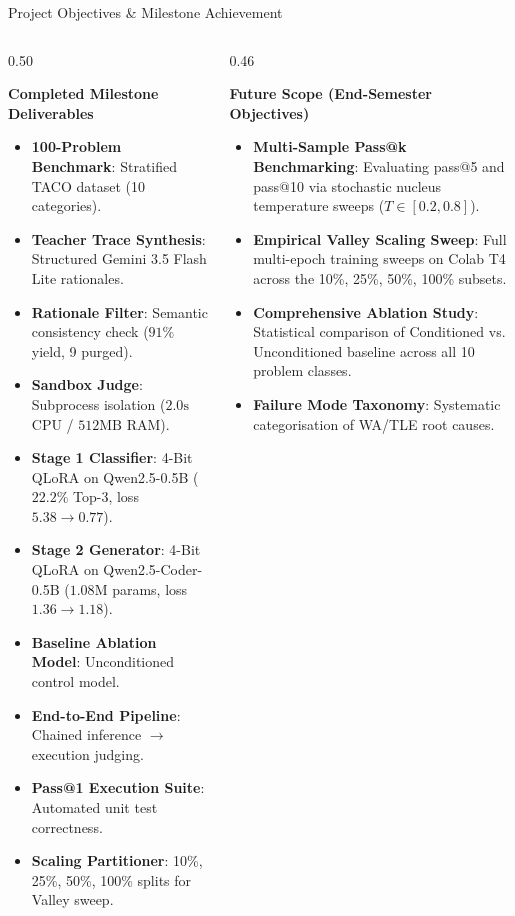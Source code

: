 \documentclass[aspectratio=169,10pt]{beamer}
\begin{document}
\begin{frame}{Project Objectives \& Milestone Achievement}
  \begin{columns}[T]
    \begin{column}{0.50\textwidth}
      \begin{block}{\textbf{Completed Milestone Deliverables}}
        \begin{itemize}\itemsep=1.0pt\scriptsize
          \item \textbf{100-Problem Benchmark}: Stratified TACO dataset (10 categories).
          \item \textbf{Teacher Trace Synthesis}: Structured Gemini 3.5 Flash Lite rationales.
          \item \textbf{Rationale Filter}: Semantic consistency check ($91\%$ yield, 9 purged).
          \item \textbf{Sandbox Judge}: Subprocess isolation ($2.0\text{s}$ CPU / $512\text{MB}$ RAM).
          \item \textbf{Stage 1 Classifier}: 4-Bit QLoRA on Qwen2.5-0.5B ($22.2\%$ Top-3, loss $5.38 \to 0.77$).
          \item \textbf{Stage 2 Generator}: 4-Bit QLoRA on Qwen2.5-Coder-0.5B ($1.08\text{M}$ params, loss $1.36 \to 1.18$).
          \item \textbf{Baseline Ablation Model}: Unconditioned control model.
          \item \textbf{End-to-End Pipeline}: Chained inference $\to$ execution judging.
          \item \textbf{Pass@1 Execution Suite}: Automated unit test correctness.
          \item \textbf{Scaling Partitioner}: 10\%, 25\%, 50\%, 100\% splits for Valley sweep.
        \end{itemize}
      \end{block}
    \end{column}

    \begin{column}{0.46\textwidth}
      \begin{exampleblock}{\textbf{Future Scope (End-Semester Objectives)}}
        \begin{itemize}\itemsep=3pt\scriptsize
          \item \textbf{Multi-Sample Pass@k Benchmarking}: Evaluating pass@5 and pass@10 via stochastic nucleus temperature sweeps ($T \in [0.2, 0.8]$).
          \item \textbf{Empirical Valley Scaling Sweep}: Full multi-epoch training sweeps on Colab T4 across the 10\%, 25\%, 50\%, 100\% subsets.
          \item \textbf{Comprehensive Ablation Study}: Statistical comparison of Conditioned vs. Unconditioned baseline across all 10 problem classes.
          \item \textbf{Failure Mode Taxonomy}: Systematic categorisation of WA/TLE root causes.
        \end{itemize}
      \end{exampleblock}
    \end{column}
  \end{columns}
\end{frame}
\end{document}
